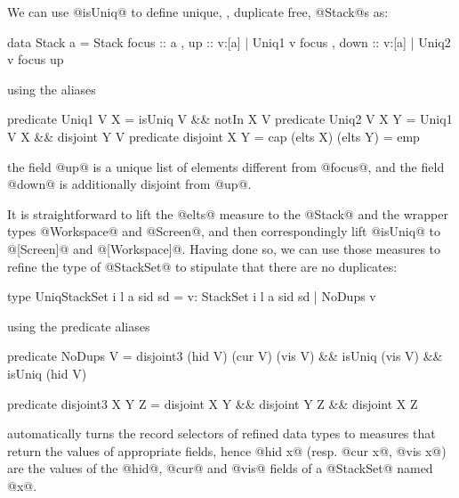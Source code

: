 We can use @isUniq@ to define unique, \ie, duplicate free,
@Stack@s as:
%
\begin{code}
  data Stack a = Stack 
   { focus :: a   
   , up    :: {v:[a] | Uniq1 v focus}
   , down  :: {v:[a] | Uniq2 v focus up} }
\end{code}
%
using the aliases
%
\begin{code}
  predicate Uniq1 V X    = isUniq V  && notIn X V
  predicate Uniq2 V X Y  = Uniq1 V X && disjoint Y V
  predicate disjoint X Y = cap (elts X) (elts Y) = emp
\end{code}
%
\ie the field @up@ is a unique list of elements different 
from @focus@, and the field @down@ is additionally disjoint 
from @up@.

It is straightforward to lift the @elts@ measure to 
the @Stack@ and the wrapper types @Workspace@ and 
@Screen@, and then correspondingly lift @isUniq@ to 
@[Screen]@ and \hbox{@[Workspace]@.}
%
Having done so, we can use those measures to refine 
the type of @StackSet@ to stipulate that there are 
no duplicates:
%
\begin{code}
  type UniqStackSet i l a sid sd 
    = {v: StackSet i l a sid sd | NoDups v} 
\end{code}
%
using the predicate aliases
%
\begin{code}
  predicate NoDups V 
    =  disjoint3 (hid V) (cur V) (vis V) 
    && isUniq (vis V) && isUniq (hid V)
  
  predicate disjoint3 X Y Z 
    =  disjoint X Y && disjoint Y Z && disjoint X Z
\end{code}
%
\toolname automatically turns the record selectors of 
refined data types to measures that return the values 
of appropriate fields, hence @hid x@ (resp. @cur x@, @vis x@)
are the values of the \hbox{@hid@,} @cur@ and @vis@ fields of
a @StackSet@ named @x@.

